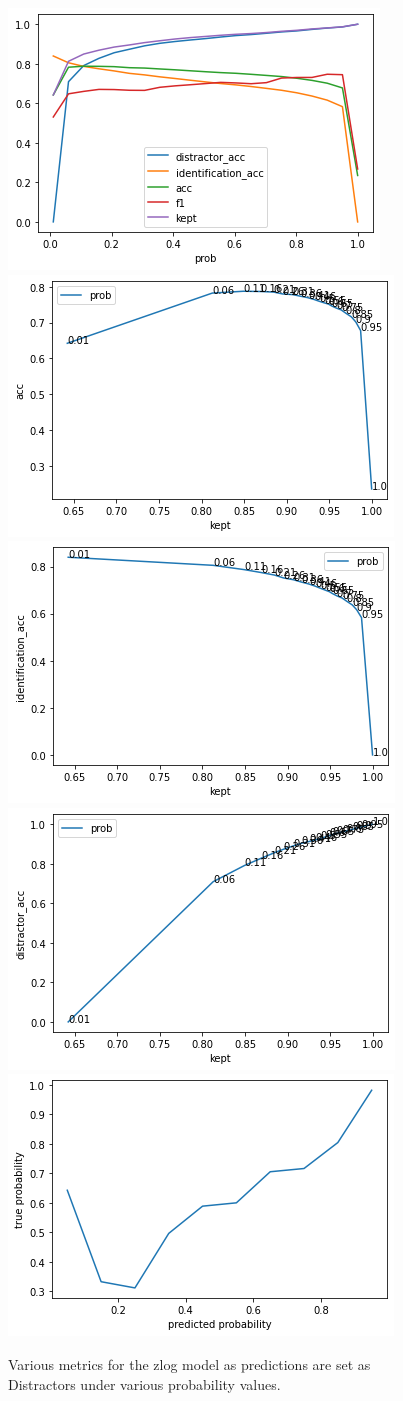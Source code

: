 \begin{figure}
    \centering
    \includegraphics[width=0.45\columnwidth]{50-files/zlog-all.png}
    \includegraphics[width=0.45\columnwidth]{50-files/zlog-acc-kept.png}
    \includegraphics[width=0.45\columnwidth]{50-files/zlog-id-kept.png}
    \includegraphics[width=0.45\columnwidth]{50-files/zlog-distr-kept.png}
    \includegraphics[width=0.45\columnwidth]{50-files/zlog-calibration.png}
    \caption{Various metrics for the zlog model as predictions are set as Distractors under various probability values.}
    \label{fig:zlog-plots}
\end{figure}

